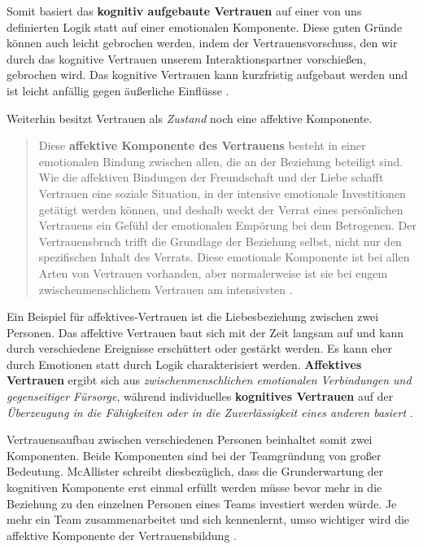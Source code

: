 \documentclass[a4paper,11pt]{article}%
\renewcommand{\\}{\vspace*{0.5\baselineskip} \newline}
\begin{document}
Somit basiert das \textbf{kognitiv aufgebaute Vertrauen} auf einer von uns definierten Logik statt auf einer emotionalen Komponente. Diese \glqq{}guten Gründe\dq{} können auch leicht gebrochen werden, indem der Vertrauensvorschuss, den wir durch das kognitive Vertrauen unserem Interaktionspartner vorschießen, gebrochen wird.
Das kognitive Vertrauen kann kurzfristig aufgebaut werden und ist leicht anfällig gegen äußerliche Einflüsse \citep[S.970]{lewis1985trust}. 

Weiterhin besitzt Vertrauen als \textit{Zustand} noch eine affektive Komponente.
\begin{quote}
\glqq{}Diese \textbf{affektive Komponente des Vertrauens} besteht in einer emotionalen Bindung zwischen allen, die an der Beziehung beteiligt sind. Wie die affektiven Bindungen der Freundschaft und der Liebe schafft Vertrauen eine soziale Situation, in der intensive emotionale Investitionen getätigt werden können, und deshalb weckt der Verrat eines persönlichen Vertrauens ein Gefühl der emotionalen Empörung bei dem Betrogenen. Der Vertrauensbruch trifft die Grundlage der Beziehung selbst, nicht nur den spezifischen Inhalt des Verrats. Diese emotionale Komponente ist bei allen Arten von Vertrauen vorhanden, aber normalerweise ist sie bei engem zwischenmenschlichem Vertrauen am intensivsten\dq{} \citep[S.971]{lewis1985trust}.
\end{quote}
Ein Beispiel für affektives-Vertrauen ist die Liebesbeziehung zwischen zwei Personen. Das affektive Vertrauen baut sich mit der Zeit langsam auf und kann durch verschiedene Ereignisse erschüttert oder gestärkt werden. Es kann eher durch Emotionen statt durch Logik charakterisiert werden.
\textbf{Affektives Vertrauen} ergibt sich aus \textit{zwischenmenschlichen emotionalen Verbindungen und gegenseitiger Fürsorge}, während individuelles \textbf{kognitives Vertrauen} auf der \textit{Überzeugung in die Fähigkeiten oder in die Zuverlässigkeit eines anderen basiert} \citep[S.30]{mcallister1995affect}.

Vertrauensaufbau zwischen verschiedenen Personen beinhaltet somit zwei Komponenten. Beide Komponenten sind bei der Teamgründung von großer Bedeutung. 
McAllister schreibt diesbezüglich, dass die Grunderwartung der kognitiven Komponente erst einmal erfüllt werden müsse bevor mehr in die Beziehung zu den einzelnen Personen eines Teams investiert werden würde. Je mehr ein Team zusammenarbeitet und sich kennenlernt, umso wichtiger wird die affektive Komponente der Vertrauensbildung \citep[S.30]{mcallister1995affect}.
\end{document}
